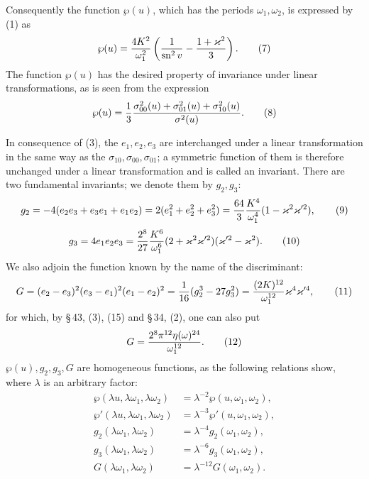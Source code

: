 \documentclass[11pt]{article}
\providecommand{\sn}{\operatorname{sn}}
\begin{document}
Consequently the function $\wp(u)$, which has the periods $\omega_1,\omega_2$, is expressed by (1) as
\begin{equation}
\wp(u)={4K^2\over\omega_1^2}\left({1\over\sn^2v}-{1+\varkappa^2\over3}\right).
\tag{7}
\end{equation}
The function $\wp(u)$ has the desired property of invariance under linear transformations, as is seen from the expression
\begin{equation}
\wp(u)={1\over3}{\sigma_{00}^2(u)+\sigma_{01}^2(u)+\sigma_{10}^2(u)\over\sigma^2(u)}.
\tag{8}
\end{equation}

In consequence of (3), the $e_1,e_2,e_3$ are interchanged under a linear transformation in the same way as the $\sigma_{10},\sigma_{00},\sigma_{01}$; a symmetric function of them is therefore unchanged under a linear transformation and is called an invariant. There are two fundamental invariants; we denote them by $g_2,g_3$:
\begin{equation}
 g_2=-4(e_2e_3+e_3e_1+e_1e_2)=2(e_1^2+e_2^2+e_3^2)
 ={64\over3}{K^4\over\omega_1^4}(1-\varkappa^2\varkappa'^2),
\tag{9}
\end{equation}
\begin{equation}
 g_3=4e_1e_2e_3={2^8\over27}{K^6\over\omega_1^6}(2+\varkappa^2\varkappa'^2)(\varkappa'^2-\varkappa^2).
\tag{10}
\end{equation}
We also adjoin the function known by the name of the discriminant:
\begin{equation}
G=(e_2-e_3)^2(e_3-e_1)^2(e_1-e_2)^2={1\over16}(g_2^3-27g_3^2)
={ (2K)^{12}\over\omega_1^{12}}\varkappa^4\varkappa'^4,
\tag{11}
\end{equation}
for which, by \S\,43, (3), (15) and \S\,34, (2), one can also put
\begin{equation}
G={2^8\pi^{12}\eta(\omega)^{24}\over\omega_1^{12}}.
\tag{12}
\end{equation}
$\wp(u),g_2,g_3,G$ are homogeneous functions, as the following relations show, where $\lambda$ is an arbitrary factor:
\begin{equation}
\begin{aligned}
\wp(\lambda u,\lambda\omega_1,\lambda\omega_2)&=\lambda^{-2}\wp(u,\omega_1,\omega_2),\\
\wp'(\lambda u,\lambda\omega_1,\lambda\omega_2)&=\lambda^{-3}\wp'(u,\omega_1,\omega_2),\\
g_2(\lambda\omega_1,\lambda\omega_2)&=\lambda^{-4}g_2(\omega_1,
\omega_2),\\
g_3(\lambda\omega_1,\lambda\omega_2)&=\lambda^{-6}g_3(\omega_1,
\omega_2),\\
G(\lambda\omega_1,\lambda\omega_2)&=\lambda^{-12}G(\omega_1,\omega_2).
\end{aligned}
\tag{13}
\end{equation}
\end{document}
